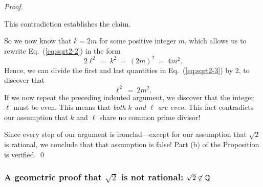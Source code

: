 \begin{proof}
\begin{description}
\smallskip

This contradiction establishes the claim.
\end{description}
So we now know that $k = 2m$ for some positive integer $m$, which allows us to rewrite Eq.~(\ref{eq:sqrt2-2}) in the form
\begin{equation}
\label{eq:sqrt2-3}
2 \ell^2 \ = \ k^2 \ = \ (2m)^2 \ = \ 4m^2.
\end{equation}
Hence, we can divide the first and last quantities in Eq.~(\ref{eq:sqrt2-3}) by $2$, to discover that
\[ \ell^2 \ = \ 2m^2. \]
If we now repeat the preceding indented argument, we discover that the integer $\ell$ must be even.  This means that {\em both $k$ and $\ell$ are even}.  This fact contradicts our assumption that $k$ and $\ell$ share no common prime divisor!

Since every step of our argument is ironclad---except for our assumption that $\sqrt{2}$ is rational, we conclude that that assumption is false!  Part (b) of the Proposition is verified. \qed
\end{proof}

\subsubsection{A geometric proof that $\sqrt{2}$ is not rational: $\sqrt{2} \not\in \mathbb{Q}$}
\label{sec:geom-proof-sqrt(2)}

